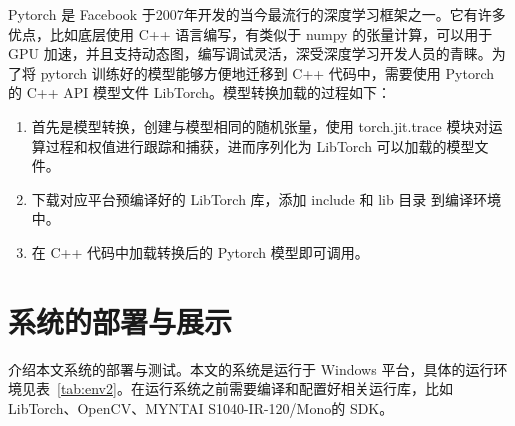 Pytorch 是 Facebook 于2007年开发的当今最流行的深度学习框架之一。它有许多优点，比如底层使用 C++ 语言编写，有类似于 numpy 的张量计算，可以用于 GPU 加速，并且支持动态图，编写调试灵活，深受深度学习开发人员的青睐。为了将 pytorch 训练好的模型能够方便地迁移到 C++ 代码中，需要使用 Pytorch 的 C++ API 模型文件 LibTorch。模型转换加载的过程如下： 

\begin{enumerate}
    \item 首先是模型转换，创建与模型相同的随机张量，使用 torch.jit.trace 模块对运算过程和权值进行跟踪和捕获，进而序列化为 LibTorch 可以加载的模型文件。
    \item 下载对应平台预编译好的 LibTorch 库，添加 include 和 lib 目录
到编译环境中。
    \item 在 C++ 代码中加载转换后的 Pytorch 模型即可调用。 
\end{enumerate}

%

\pagebreak
\section{系统的部署与展示}\label{figures_tables}

介绍本文系统的部署与测试。本文的系统是运行于 Windows 平台，具体的运行环境见表~\ref{tab:env2}。在运行系统之前需要编译和配置好相关运行库，比如 LibTorch、OpenCV、MYNTAI S1040-IR-120/Mono的 SDK。

